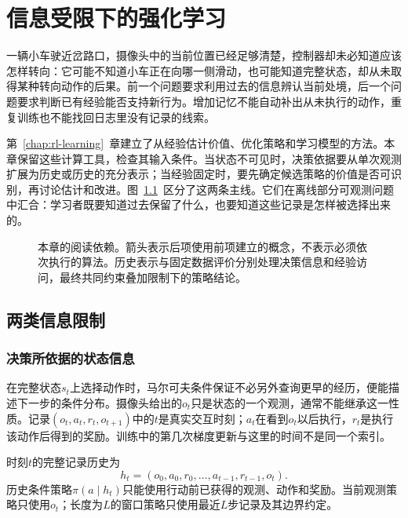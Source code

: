\chapter{信息受限下的强化学习}
\label{chap:rl-information}

一辆小车驶近岔路口，摄像头中的当前位置已经足够清楚，控制器却未必知道应该怎样转向：它可能不知道小车正在向哪一侧滑动，也可能知道完整状态，却从未取得某种转向动作的后果。前一个问题要求利用过去的信息辨认当前处境，后一个问题要求判断已有经验能否支持新行为。增加记忆不能自动补出从未执行的动作，重复训练也不能找回日志里没有记录的线索。

第~\ref{chap:rl-learning}~章建立了从经验估计价值、优化策略和学习模型的方法。本章保留这些计算工具，检查其输入条件。当状态不可见时，决策依据要从单次观测扩展为历史或历史的充分表示；当经验固定时，要先确定候选策略的价值是否可识别，再讨论估计和改进。图~\ref{fig:rl-information-roadmap}~区分了这两条主线。它们在离线部分可观测问题中汇合：学习者既要知道过去保留了什么，也要知道这些记录是怎样被选择出来的。

\begin{figure}[htbp]
  \centering
  
  \caption{本章的阅读依赖。箭头表示后项使用前项建立的概念，不表示必须依次执行的算法。历史表示与固定数据评价分别处理决策信息和经验访问，最终共同约束叠加限制下的策略结论。}
  \label{fig:rl-information-roadmap}
\end{figure}

\section{两类信息限制}
\label{sec:rl-information-limits}

\subsection{决策所依据的状态信息}
\label{sec:rl-information-state-information}

在完整状态$s_t$上选择动作时，马尔可夫条件保证不必另外查询更早的经历，便能描述下一步的条件分布。摄像头给出的$o_t$只是状态的一个观测，通常不能继承这一性质。记录$(o_t,a_t,r_t,o_{t+1})$中的$t$是真实交互时刻；$a_t$在看到$o_t$以后执行，$r_t$是执行该动作后得到的奖励。训练中的第几次梯度更新与这里的时间不是同一个索引。

\begin{definition}[决策历史]
  \label{def:rl-information-history}
  时刻$t$的完整记录历史为
  \[
    h_t=(o_0,a_0,r_0,\ldots,a_{t-1},r_{t-1},o_t).
  \]
  历史条件策略$\pi(a\mid h_t)$只能使用行动前已获得的观测、动作和奖励。当前观测策略只使用$o_t$；长度为$L$的窗口策略只使用最近$L$步记录及其边界约定。
\end{definition}

